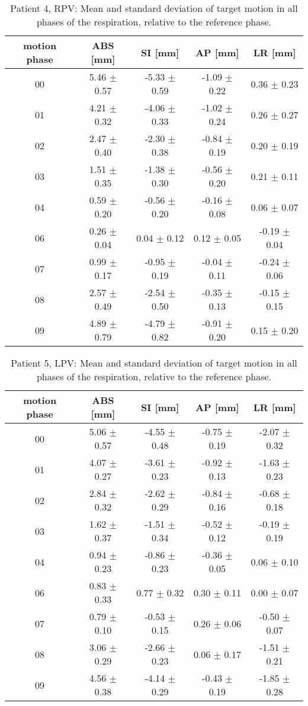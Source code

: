 \begin{table}[H]
  \centering
  \caption{Patient 4, RPV: Mean and standard deviation of target motion in all phases of the respiration, relative to the reference phase.}
  \begin{tabular}{|c|c|c|c|c|}
    \hline\hline
    motion phase & ABS [mm] & SI [mm] & AP [mm] & LR [mm]\\
    \hline 
00& 5.46 $\pm$ 0.57& -5.33 $\pm$ 0.59& -1.09 $\pm$ 0.22& 0.36 $\pm$ 0.23 \\
01& 4.21 $\pm$ 0.32& -4.06 $\pm$ 0.33& -1.02 $\pm$ 0.24& 0.26 $\pm$ 0.27 \\
02& 2.47 $\pm$ 0.40& -2.30 $\pm$ 0.38& -0.84 $\pm$ 0.19& 0.20 $\pm$ 0.19 \\
03& 1.51 $\pm$ 0.35& -1.38 $\pm$ 0.30& -0.56 $\pm$ 0.20& 0.21 $\pm$ 0.11 \\
04& 0.59 $\pm$ 0.20& -0.56 $\pm$ 0.20& -0.16 $\pm$ 0.08& 0.06 $\pm$ 0.07 \\
06& 0.26 $\pm$ 0.04& 0.04 $\pm$ 0.12& 0.12 $\pm$ 0.05& -0.19 $\pm$ 0.04 \\
07& 0.99 $\pm$ 0.17& -0.95 $\pm$ 0.19& -0.04 $\pm$ 0.11& -0.24 $\pm$ 0.06 \\
08& 2.57 $\pm$ 0.49& -2.54 $\pm$ 0.50& -0.35 $\pm$ 0.13& -0.15 $\pm$ 0.15 \\
09& 4.89 $\pm$ 0.79& -4.79 $\pm$ 0.82& -0.91 $\pm$ 0.20& 0.15 $\pm$ 0.20 \\
        \hline\hline
  \end{tabular}
\end{table}


\begin{table}[H]
  \centering
  \caption{Patient 5, LPV: Mean and standard deviation of target motion in all phases of the respiration, relative to the reference phase.}
  \begin{tabular}{|c|c|c|c|c|}
    \hline\hline
    motion phase & ABS [mm] & SI [mm] & AP [mm] & LR [mm]\\
    \hline 
00& 5.06 $\pm$ 0.57& -4.55 $\pm$ 0.48& -0.75 $\pm$ 0.19& -2.07 $\pm$ 0.32 \\
01& 4.07 $\pm$ 0.27& -3.61 $\pm$ 0.23& -0.92 $\pm$ 0.13& -1.63 $\pm$ 0.23 \\
02& 2.84 $\pm$ 0.32& -2.62 $\pm$ 0.29& -0.84 $\pm$ 0.16& -0.68 $\pm$ 0.18 \\
03& 1.62 $\pm$ 0.37& -1.51 $\pm$ 0.34& -0.52 $\pm$ 0.12& -0.19 $\pm$ 0.19 \\
04& 0.94 $\pm$ 0.23& -0.86 $\pm$ 0.23& -0.36 $\pm$ 0.05& 0.06 $\pm$ 0.10 \\
06& 0.83 $\pm$ 0.33& 0.77 $\pm$ 0.32& 0.30 $\pm$ 0.11& 0.00 $\pm$ 0.07 \\
07& 0.79 $\pm$ 0.10& -0.53 $\pm$ 0.15& 0.26 $\pm$ 0.06& -0.50 $\pm$ 0.07 \\
08& 3.06 $\pm$ 0.29& -2.66 $\pm$ 0.23& 0.06 $\pm$ 0.17& -1.51 $\pm$ 0.21 \\
09& 4.56 $\pm$ 0.38& -4.14 $\pm$ 0.29& -0.43 $\pm$ 0.19& -1.85 $\pm$ 0.28 \\
        \hline\hline
  \end{tabular}
\end{table}

